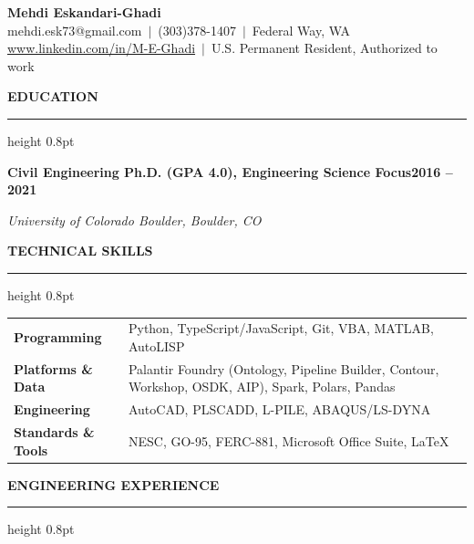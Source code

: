 \documentclass[10pt, letterpaper]{article}
\newcommand{\rsection}[1]{%
  \vspace{8pt}%
  {\large\bfseries\MakeUppercase{#1}}%
  \vspace{1pt}%
  \hrule height 0.8pt%
  \vspace{4pt}%
}
\newcommand{\jobline}[2]{%
  \vspace{5pt}%
  \noindent\textbf{#1}\hfill\textbf{#2}\par%
  \vspace{1pt}%
}
\newcommand{\subline}[1]{%
  \vspace{-1pt}%
  \noindent\textit{#1}\par%
  \vspace{1pt}%
}
\begin{document}
\pagestyle{empty}

\begin{center}
  {\LARGE\bfseries Mehdi Eskandari-Ghadi}\\[4pt]
  mehdi.esk73@gmail.com\ $|$\ (303)378-1407\ $|$\ Federal Way, WA\\[2pt]
  \href{http://www.linkedin.com/in/M-E-Ghadi}{www.linkedin.com/in/M-E-Ghadi}\ $|$\
  U.S. Permanent Resident, Authorized to work
\end{center}

\vspace{2pt}

\rsection{Education}

\jobline{Civil Engineering Ph.D. (GPA 4.0), Engineering Science Focus}{2016 -- 2021}
\subline{University of Colorado Boulder, Boulder, CO}

\rsection{Technical Skills}

\vspace{2pt}
\begin{tabular}{@{}p{3.4cm}p{14.4cm}@{}}
  \textbf{Programming}       & Python, TypeScript/JavaScript, Git, VBA, MATLAB, AutoLISP \\[2pt]
  \textbf{Platforms \& Data} & Palantir Foundry (Ontology, Pipeline Builder, Contour, Workshop, OSDK, AIP), Spark, Polars, Pandas \\[2pt]
  \textbf{Engineering}       & AutoCAD, PLSCADD, L-PILE, ABAQUS/LS-DYNA \\[2pt]
  \textbf{Standards \& Tools} & NESC, GO-95, FERC-881, Microsoft Office Suite, LaTeX \\
\end{tabular}

\rsection{Engineering Experience}
\end{document}
